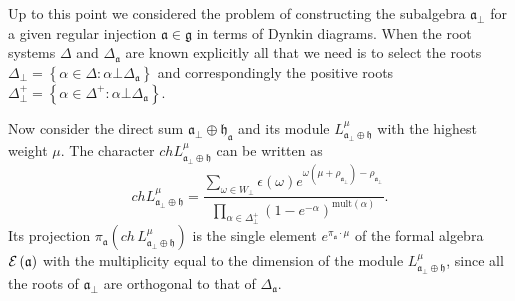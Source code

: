 \documentclass[a4paper,12pt]{article}
\theoremstyle{definition} \newtheorem{Def}{Definition}
\begin{document}
Up to this point we considered the problem of constructing the subalgebra $\mathfrak{a}_{\bot}$ for a given regular injection $\mathfrak{a}\in\mathfrak{g}$  in terms of Dynkin diagrams. When the root systems $ \Delta$ and $\Delta_{\mathfrak{a}}$ are known explicitly all that we need is to select the roots
$\Delta_{\bot}=\left\{\alpha\in \Delta:\alpha\bot \Delta_{\mathfrak{a}}\right\}$ and correspondingly the positive roots
$\Delta^{+}_{\bot}=\left\{\alpha\in \Delta^{+}:\alpha\bot \Delta_{\mathfrak{a}}\right\}$. 

Now consider the direct sum $\mathfrak{a}_{\bot}\oplus\mathfrak{h}_{\mathfrak{a}}$ and its module $L^{\mu}_{\mathfrak{a}_{\bot}\oplus \mathfrak{h}}$
with the highest weight $\mu$. The character $ch L^{\mu}_{\mathfrak{a}_{\bot}\oplus \mathfrak{h}}$ can be written as
\begin{equation}
  \label{eq:41}
  ch L^{\mu}_{\mathfrak{a}_{\bot}\oplus \mathfrak{h}}= \frac{\sum_{\omega\in W_{\bot}} \epsilon(\omega) e^{\omega(\mu+\rho_{\mathfrak{a}_{\bot}})-\rho_{\mathfrak{a}_{\bot}}}}{\prod_{\alpha\in\Delta^{+}_{\bot}}(1-e^{-\alpha})^{\mathrm{mult}(\alpha)}}.
\end{equation}
Its projection $\pi_{\mathfrak{a}}(ch\, L^{\mu}_{\mathfrak{a}_{\bot}\oplus \mathfrak{h}})$ is the single element $e^{\pi_{\mathfrak{a}} \cdot\mu}$ of the formal algebra ${\cal E}\left( \mathfrak{a}\right)$ with the multiplicity equal to the dimension of the module $L^{\mu}_{\mathfrak{a}_{\bot}\oplus \mathfrak{h}}$, since all the roots of $\mathfrak{a}_{\bot}$ are orthogonal to  that of $\Delta_{\mathfrak{a}}$.
\end{document}
